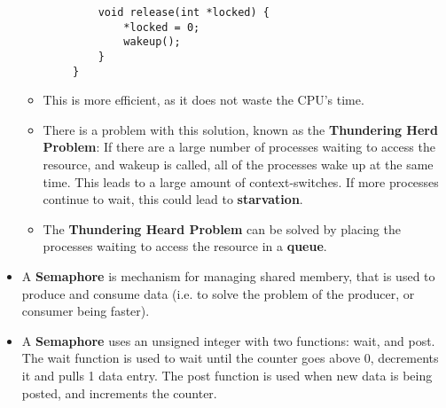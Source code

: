\documentclass{article}
\begin{document}
\begin{itemize}
\begin{verbatim}
            void release(int *locked) {
                *locked = 0;
                wakeup();
            }
        }
    \end{verbatim}
    \begin{itemize}
        \item This is more efficient, as it does not waste the CPU's time.
        \item There is a problem with this solution, known as the \textbf{Thundering Herd Problem}: If there are a large number of processes waiting to access the resource, and wakeup is called, all of the processes wake up at the same time. This leads to a large amount of context-switches. If more processes continue to wait, this could lead to \textbf{starvation}.
        \item The \textbf{Thundering Heard Problem} can be solved by placing the processes waiting to access the resource in a \textbf{queue}.
    \end{itemize}
    \item A \textbf{Semaphore} is mechanism for managing shared membery, that is used to produce and consume data (i.e. to solve the problem of the producer, or consumer being faster).
    \item A \textbf{Semaphore} uses an unsigned integer with two functions: wait, and post. The wait function is used to wait until the counter goes above 0, decrements it and pulls 1 data entry. The post function is used when new data is being posted, and increments the counter.
\end{itemize}
\end{document}
